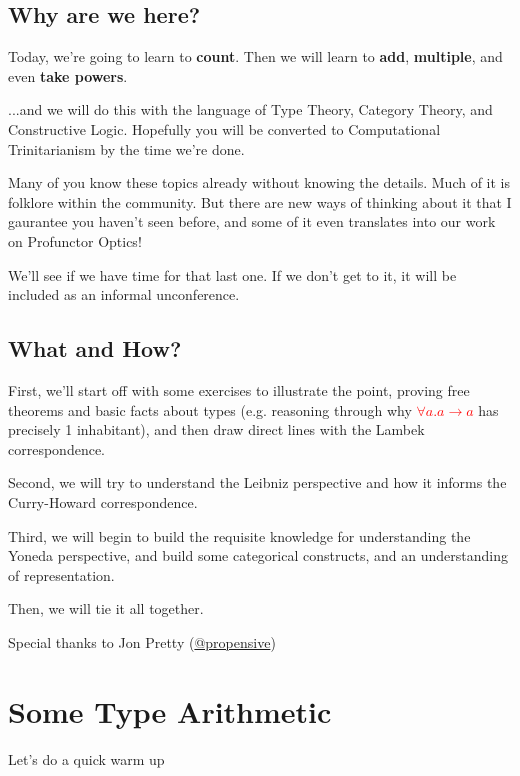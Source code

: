 \documentclass[tikz]{beamer}
\newcommand{\red}[1]{\textcolor{red}{#1}}
\theoremstyle{definition}
\begin{document}
\subsection{Why are we here?}

\frame
{ 
	Today, we're going to learn to \textbf{count}. Then we will learn to \textbf{add}, \textbf{multiple}, and even \textbf{take powers}. 
}

\frame
{ 
	...and we will do this with the language of Type Theory, Category Theory, and Constructive Logic. Hopefully you will be converted to Computational Trinitarianism by the time we're done.
}

\frame
{ 
	Many of you know these topics already without knowing the details. Much of it is folklore within the community. But there are new ways of thinking about it that I gaurantee you haven't seen before, and some of it even translates into our work on Profunctor Optics! 
}

\frame
{ 
	We'll see if we have time for that last one. If we don't get to it, it will be included as an informal unconference.
}

\subsection{What and How?}

\frame
{ 
	First, we'll start off with some exercises to illustrate the point, proving free theorems and basic facts about types (e.g. reasoning through why \red{$\forall a. a \to a$} has precisely 1 inhabitant), and then draw direct lines with the Lambek correspondence. 
}

\frame
{ 
	Second, we will try to understand the Leibniz perspective and how it informs the Curry-Howard correspondence. 
}

\frame
{ 
	Third, we will begin to build the requisite knowledge for understanding the Yoneda perspective, and build some categorical constructs, and an understanding of representation. 
}

\frame
{ 
	Then, we will tie it all together. 
}

\frame
{ 
	Special thanks to Jon Pretty (\href{https://twitter.com/propensive}{@propensive})
}

\section{Some Type Arithmetic}

\frame
{
	Let's do a quick warm up 
}
\end{document}
